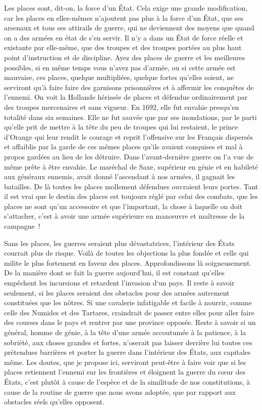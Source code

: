 \documentclass[french,twoside]{book} %
\begin{document}
Les places sont, dit-on, la force d’un État. Cela exige une grande modification, car les places en elles-mêmes n’ajoutent pas plus à la force d’un État, que ses arsenaux et tous ses attirails de guerre, qui ne deviennent des moyens que quand on a des armées en état de s’en servir. Il n’y a dans un État de force réelle et existante par elle-même, que des troupes et des troupes portées au plus haut point d’instruction et de discipline. Ayez des places de guerre et les meilleures possibles, si en même temps vous n’avez pas d’armée, ou si cette armée est mauvaise, ces places, quelque multipliées, quelque fortes qu’elles soient, ne serviront qu’à faire faire des garnisons prisonnières et à affermir les conquêtes de l’ennemi. On voit la Hollande hérissée de places et défendue ordinairement par des troupes mercenaires et sans vigueur. En 1692, elle fut envahie presqu’en totalité dans six semaines. Elle ne fut sauvée que par ses inondations, par le parti qu’elle prit de mettre à la tête du peu de troupes qui lui restaient, le prince d’Orange qui leur rendit le courage et reprit l’offensive sur les Français dispersés et affaiblis par la garde de ces mêmes places qu’ils avaient conquises et mal à propos gardées au lieu de les détruire. Dans l’avant-dernière guerre on l’a vue de même prête à être envahie. Le maréchal de Saxe, supérieur en génie et en habileté aux généraux ennemis, avait donné l’ascendant à nos armées, il gagnait les batailles. De là toutes les places mollement défendues ouvraient leurs portes. Tant il est vrai que le destin des places est toujours réglé par celui des combats, que les places ne sont qu’un accessoire et que l’important, la chose à laquelle on doit s’attacher, c’est à avoir une armée supérieure en manœuvre et maîtresse de la campagne !\par
Sans les places, les guerres seraient plus dévastatrices, l’intérieur des États courrait plus de risque. Voilà de toutes les objections la plus fondée et celle qui milite le plus fortement en faveur des places. Approfondissons là soigneusement. De la manière dont se fait la guerre aujourd’hui, il est constant qu’elles empêchent les incursions et retardent l’invasion d‘un pays. Il reste à savoir seulement, si les places seraient des obstacles pour des armées autrement constituées que les nôtres. Si une cavalerie infatigable et facile à nourrir, comme celle des Numides et des Tartares, craindrait de passer entre elles pour aller faire des courses dans le pays et rentrer par une province opposée. Reste à savoir si un général, homme de génie, à la tête d’une armée accoutumée à la patience, à la sobriété, aux choses grandes et fortes, n’oserait pas laisser derrière lui toutes ces prétendues barrières et porter la guerre dans l’intérieur des États, aux capitales même. Les doutes, que je propose ici, serviront peut-être à faire voir que si les places retiennent l’ennemi sur les frontières et éloignent la guerre du cœur des États, c’est plutôt à cause de l’espèce et de la similitude de nos constitutions, à cause de la routine de guerre que nous avons adoptée, que par rapport aux obstacles réels qu’elles opposent.\par
\end{document}
